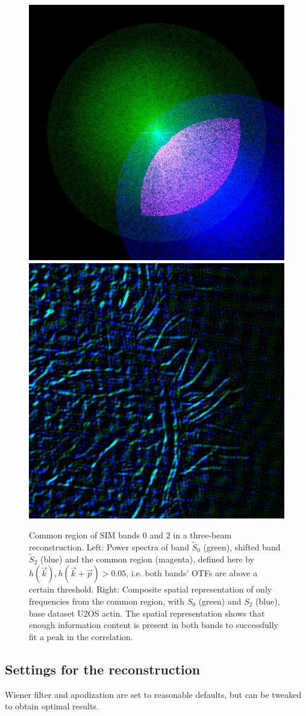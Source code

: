 \documentclass[twoside=false,
           twocolumn=false,
           a4paper,DIV=15,
           10pt]{scrartcl}
\begin{document}
\begin{figure}[b]
\begin{center}
\includegraphics[width=.45\textwidth]{../figures/OtfOverlap_freq}
\includegraphics[width=.45\textwidth]{../figures/OtfOverlap_spatial}
\end{center}
\caption{Common region of SIM bands $0$ and $2$ in a 
three-beam reconstruction. Left: Power spectra of
band $\tilde S_0$ (green), shifted band $\tilde S_2$ (blue) and the 
common region (magenta), defined here by 
$h(\vec k),h(\vec k +\vec p)>0.05$, i.e. both bands' OTFs
are above a certain threshold. Right: Composite spatial 
representation of only frequencies from the common region, 
with $S_0$ (green) and $S_2$ (blue), base dataset U2OS actin.
The spatial representation shows that enough information
content is present in both bands to successfully fit
a peak in the correlation.
}
\label{fig-otfcommon}
\end{figure}


\subsection{Settings for the reconstruction}

Wiener filter and apodization are set to reasonable
defaults, but can be tweaked to obtain optimal results.
\end{document}
